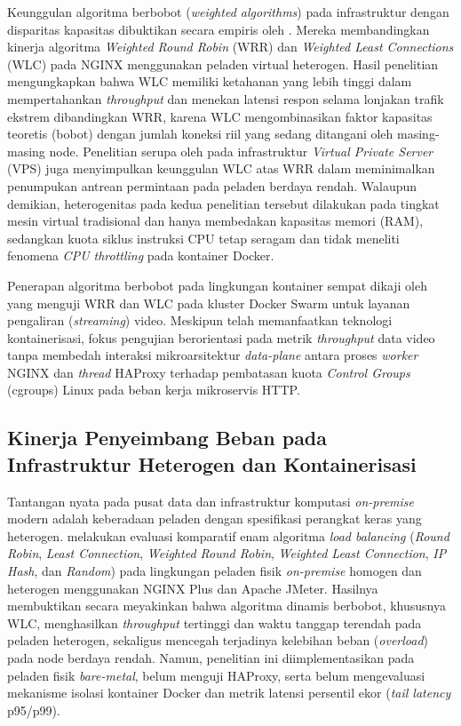 Keunggulan algoritma berbobot (\textit{weighted algorithms}) pada infrastruktur dengan disparitas kapasitas dibuktikan secara empiris oleh \citet{baeturohman2024analisis}. Mereka membandingkan kinerja algoritma \textit{Weighted Round Robin} (WRR) dan \textit{Weighted Least Connections} (WLC) pada NGINX menggunakan peladen virtual heterogen. Hasil penelitian mengungkapkan bahwa WLC memiliki ketahanan yang lebih tinggi dalam mempertahankan \textit{throughput} dan menekan latensi respon selama lonjakan trafik ekstrem dibandingkan WRR, karena WLC mengombinasikan faktor kapasitas teoretis (bobot) dengan jumlah koneksi riil yang sedang ditangani oleh masing-masing node. Penelitian serupa oleh \citet{rizqi2022analisis} pada infrastruktur \textit{Virtual Private Server} (VPS) juga menyimpulkan keunggulan WLC atas WRR dalam meminimalkan penumpukan antrean permintaan pada peladen berdaya rendah. Walaupun demikian, heterogenitas pada kedua penelitian tersebut dilakukan pada tingkat mesin virtual tradisional dan hanya membedakan kapasitas memori (RAM), sedangkan kuota siklus instruksi CPU tetap seragam dan tidak meneliti fenomena \textit{CPU throttling} pada kontainer Docker.

Penerapan algoritma berbobot pada lingkungan kontainer sempat dikaji oleh \citet{rahman2023perbandingan} yang menguji WRR dan WLC pada kluster Docker Swarm untuk layanan pengaliran (\textit{streaming}) video. Meskipun telah memanfaatkan teknologi kontainerisasi, fokus pengujian berorientasi pada metrik \textit{throughput} data video tanpa membedah interaksi mikroarsitektur \textit{data-plane} antara proses \textit{worker} NGINX dan \textit{thread} HAProxy terhadap pembatasan kuota \textit{Control Groups} (cgroups) Linux pada beban kerja mikroservis HTTP.

\subsection{Kinerja Penyeimbang Beban pada Infrastruktur Heterogen dan Kontainerisasi}
Tantangan nyata pada pusat data dan infrastruktur komputasi \textit{on-premise} modern adalah keberadaan peladen dengan spesifikasi perangkat keras yang heterogen. \citet{faridah2026performance} melakukan evaluasi komparatif enam algoritma \textit{load balancing} (\textit{Round Robin}, \textit{Least Connection}, \textit{Weighted Round Robin}, \textit{Weighted Least Connection}, \textit{IP Hash}, dan \textit{Random}) pada lingkungan peladen fisik \textit{on-premise} homogen dan heterogen menggunakan NGINX Plus dan Apache JMeter. Hasilnya membuktikan secara meyakinkan bahwa algoritma dinamis berbobot, khususnya WLC, menghasilkan \textit{throughput} tertinggi dan waktu tanggap terendah pada peladen heterogen, sekaligus mencegah terjadinya kelebihan beban (\textit{overload}) pada node berdaya rendah. Namun, penelitian ini diimplementasikan pada peladen fisik \textit{bare-metal}, belum menguji HAProxy, serta belum mengevaluasi mekanisme isolasi kontainer Docker dan metrik latensi persentil ekor (\textit{tail latency} p95/p99).


